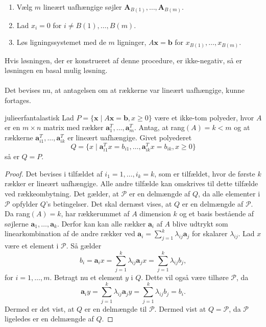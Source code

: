 \begin{enumerate}
\item Vælg $m$ lineært uafhængige søjler $\textbf{A}_{B(1)},\ldots,\textbf{A}_{B(m)}.$
\item Lad $x_i=0$ for $i \neq B(1),\ldots,B(m).$
\item Løs ligningssystemet med de $m$ ligninger, $A\textbf{x}=\textbf{b}$ for $x_{B(1)}, \ldots , x_{B(m)}.$
\end{enumerate}
Hvis løsningen, der er konstrueret af denne procedure, er ikke-negativ, så er løsningen en basal mulig løsning.
\\\\
\noindent
Det bevises nu, at antagelsen om at rækkerne var lineært uafhængige, kunne fortages.
\begin{thm}{}{julieerfantalastisk}
Lad $P=\{\textbf{x} \mid  A\textbf{x}=\textbf{b},x\geq 0\}$ være et ikke-tom polyeder, hvor $A$ er en $m \times n$ matrix med rækker $\textbf{a}^{T}_{1},\ldots,\textbf{a}^{T}_{m}$.
Antag, at rang$(A)=k<m$ og at rækkerne $\textbf{a}^T_{i1},\ldots,\textbf{a}^T_{ik}$ er lineært uafhængige. Givet polyederet 
$$Q=\{x \mid \textbf{a}^T_{i1}x=b_{i1},\ldots,\textbf{a}^T_{ik}x=b_{ik}, x \geq 0  \}$$ 
så er $Q=P$.
\end{thm}
\begin{proof}
Det bevises i tilfældet af $i_1=1,\ldots,i_k=k$, som er tilfældet, hvor de første $k$ rækker er lineært uafhængige. 
Alle andre tilfælde kan omskrives til dette tilfælde ved rækkeombytning. 
Det gælder, at $\mathcal{P}$ er en delmængde af $Q$, da alle elementer i $\mathcal{P}$ opfylder $Q$'s betingelser. 
Det skal dernæst vises, at $Q$ er en delmængde af $\mathcal{P}$.
Da rang$(A)=k$, har rækkerummet af $A$ dimension $k$ og et basis bestående af søjlerne $\textbf{a}_1,\ldots,\textbf{a}_k$. 
Derfor kan kan alle rækker $\textbf{a}_i$ af $A$ blive udtrykt som linearkombination af de andre rækker ved $\textbf{a}_i=\sum^{k}_{j=1}\lambda_{ij}\textbf{a}_j$ for skalarer $\lambda_{ij}$. 
Lad $x$ være et element i $\mathcal{P}$. 
Så gælder
$$b_i=\textbf{a}_ix=\sum^{k}_{j=1}\lambda_{ij}\textbf{a}_jx=\sum^{k}_{j=1}\lambda_{ij}b_j,$$
for $i=1,\ldots,m.$
Betragt nu et element $y$ i $Q$. 
Dette vil også være tilhøre $\mathcal{P}$, da
$$ \textbf{a}_iy=\sum^{k}_{j=1}\lambda_{ij}\textbf{a}_jy=\sum^{k}_{j=1}\lambda_{ij}b_j=b_i.$$
Dermed er det vist, at $Q$ er en delmængde til $\mathcal{P}$. 
Dermed vist at $Q=\mathcal{P}$, da $\mathcal{P}$ ligeledes er en delmængde af $Q$.
\end{proof} \\